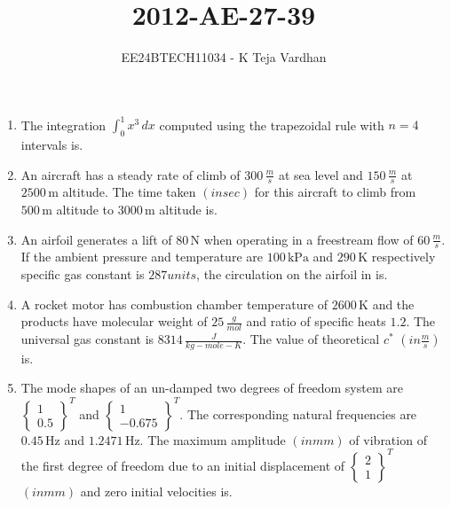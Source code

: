 \documentclass[journal]{IEEEtran}
\newcommand{\brak}[1]{\left( #1 \right)}
\begin{document}

\title{2012-AE-27-39}
\author{EE24BTECH11034 - K Teja Vardhan}
{\let\newpage\relax\maketitle}


\begin{enumerate}

    \item The integration $ \int_0^1 x^3 \, dx $ computed using the trapezoidal rule with $ n = 4 $ intervals is.
    
    \item An aircraft has a steady rate of climb of $300 \, \frac{m}{s}$ at sea level and $150 \, \frac{m}{s}$ at $2500 \, \text{m}$ altitude. The time taken $\brak{in sec}$ for this aircraft to climb from $500 \, \text{m}$ altitude to $3000 \, \text{m}$ altitude is.
    
    \item An airfoil generates a lift of $80 \, \text{N}$ when operating in a freestream flow of $60 \, \frac{m}{s}$. If the ambient pressure and temperature are $100 \, \text{kPa}$ and $290 \, \text{K}$ respectively specific gas constant is $287 units$, the circulation on the airfoil in is.
    
    \item A rocket motor has combustion chamber temperature of $2600 \, \text{K}$ and the products have molecular weight of $25 \, \frac{g}{mol}$ and ratio of specific heats $1.2$. The universal gas constant is $8314 \, \frac{J}{kg-mole-K}$. The value of theoretical $ c^* $ $\brak{in \frac{m}{s}}$ is.
    
    \item The mode shapes of an un-damped two degrees of freedom system are $ \begin{Bmatrix} 1 \\ 0.5 \end{Bmatrix}^T $ and $ \begin{Bmatrix} 1 \\ -0.675 \end{Bmatrix}^T $. The corresponding natural frequencies are $0.45 \, \text{Hz}$ and $1.2471 \, \text{Hz}$. The maximum amplitude $\brak{in mm}$ of vibration of the first degree of freedom due to an initial displacement of $ \begin{Bmatrix} 2 \\ 1 \end{Bmatrix}^T $ $\brak{in mm}$ and zero initial velocities is.
    

\end{enumerate}
\end{document}

